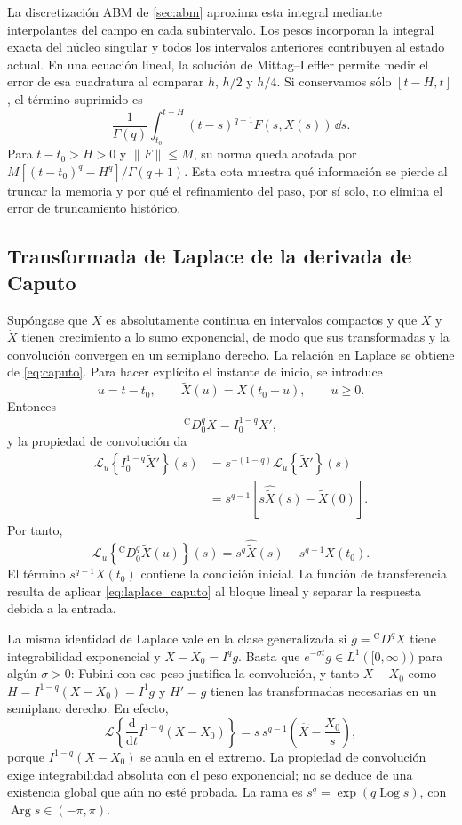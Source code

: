 La discretización ABM de \cref{sec:abm} aproxima esta integral mediante
interpolantes del campo en cada subintervalo. Los pesos incorporan la integral
exacta del núcleo singular y todos los intervalos anteriores contribuyen al
estado actual. En una ecuación lineal, la solución de Mittag--Leffler permite
medir el error de esa cuadratura al comparar \(h\), \(h/2\) y \(h/4\).
Si conservamos sólo \([t-H,t]\), el término suprimido es
\[
 \frac1{\Gamma(q)}\int_{t_0}^{t-H}(t-s)^{q-1}F(s,X(s))\,\dd s.
\]
Para \(t-t_0>H>0\) y \(\|F\|\le M\), su norma queda acotada por
\(M[(t-t_0)^q-H^q]/\Gamma(q+1)\). Esta cota muestra qué información
se pierde al truncar la memoria y por qué el refinamiento del paso, por sí
solo, no elimina el error de truncamiento histórico.

\subsection{Transformada de Laplace de la derivada de Caputo}

Supóngase que \(X\) es absolutamente continua en intervalos compactos y
que \(X\) y \(\dot X\) tienen crecimiento a lo sumo exponencial, de modo
que sus transformadas y la convolución convergen en un semiplano derecho.
La relación en Laplace se obtiene de \cref{eq:caputo}. Para hacer
explícito el instante de inicio, se introduce
\[
u=t-t_0,\qquad \widetilde X(u)=X(t_0+u),\qquad u\geq0.
\]
Entonces
\[
{}^{\mathrm C}D_{0}^{q}\widetilde X
=I_0^{1-q}\widetilde X',
\]
y la propiedad de convolución da
\begin{align}
\mathcal L_u\!\left\{I_0^{1-q}\widetilde X'\right\}(s)
&=s^{-(1-q)}
\mathcal L_u\!\left\{\widetilde X'\right\}(s)\nonumber\\
&=s^{q-1}\left[s\widehat{\widetilde X}(s)-\widetilde X(0)\right].
\end{align}
Por tanto,
\begin{equation}
\boxed{
\mathcal L_u\!\left\{{}^{\mathrm C}D_0^q\widetilde X(u)\right\}(s)
=s^q\widehat{\widetilde X}(s)-s^{q-1}X(t_0).
}
\label{eq:laplace_caputo}
\end{equation}
El término \(s^{q-1}X(t_0)\) contiene la condición inicial. La función de
transferencia resulta de aplicar
\cref{eq:laplace_caputo} al bloque lineal y separar la respuesta debida a la
entrada.

La misma identidad de Laplace vale en la clase generalizada si
$g={}^{\mathrm C}D^qX$ tiene integrabilidad exponencial y
$X-X_0=I^qg$. Basta que $e^{-\sigma t}g\in L^1([0,\infty))$ para algún
$\sigma>0$: Fubini con ese peso justifica la convolución, y tanto
$X-X_0$ como $H=I^{1-q}(X-X_0)=I^1g$ y $H'=g$ tienen las
transformadas necesarias en un semiplano derecho. En efecto,
\[
 \mathcal L\!\left\{\frac{\mathrm d}{\mathrm dt}
 I^{1-q}(X-X_0)\right\}
 =s\,s^{q-1}\left(\widehat X-\frac{X_0}{s}\right),
\]
porque $I^{1-q}(X-X_0)$ se anula en el extremo.
La propiedad de convolución exige integrabilidad absoluta con el peso
exponencial; no se deduce de una existencia global que aún no esté probada.
La rama es $s^q=\exp(q\operatorname{Log}s)$, con
$\operatorname{Arg}s\in(-\pi,\pi)$.


